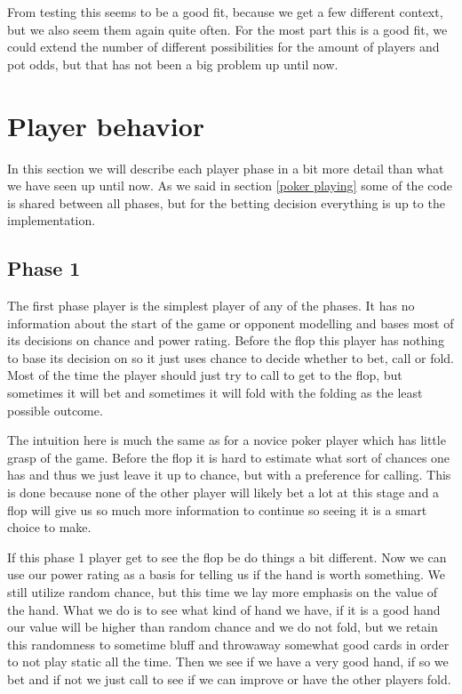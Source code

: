 \documentclass[titlepage, a4paper]{article}
\begin{document}
From testing this seems to be a good fit, because we get a few different context, but
we also seem them again quite often. For the most part this is a good fit, we could
extend the number of different possibilities for the amount of players and pot odds, but
that has not been a big problem up until now.

\section{Player behavior}\label{player behavior}
In this section we will describe each player phase in a bit more detail than what
we have seen up until now. As we said in section \ref{poker playing} some of the
code is shared between all phases, but for the betting decision everything is
up to the implementation.

\subsection{Phase 1}\label{phase 1 player}
The first phase player is the simplest player of any of the phases. It has no 
information about the start of the game or opponent modelling and bases most
of its decisions on chance and power rating. Before the flop this player
has nothing to base its decision on so it just uses chance to decide whether
to bet, call or fold. Most of the time the player should just try to call to
get to the flop, but sometimes it will bet and sometimes it will fold with the folding
as the least possible outcome.

The intuition here is much the same as for a novice poker player which has little
grasp of the game. Before the flop it is hard to estimate what sort of chances
one has and thus we just leave it up to chance, but with a preference for calling.
This is done because none of the other player will likely bet a lot at this stage
and a flop will give us so much more information to continue so seeing it is a 
smart choice to make.

If this phase 1 player get to see the flop be do things a bit different. Now we
can use our power rating as a basis for telling us if the hand is worth something.
We still utilize random chance, but this time we lay more emphasis on the value
of the hand. What we do is to see what kind of hand we have, if it is a good hand
our value will be higher than random chance and we do not fold, but we retain this
randomness to sometime bluff and throwaway somewhat good cards in order to not
play static all the time. Then we see if we have a very good hand, if so we bet and
if not we just call to see if we can improve or have the other players fold.
\end{document}
